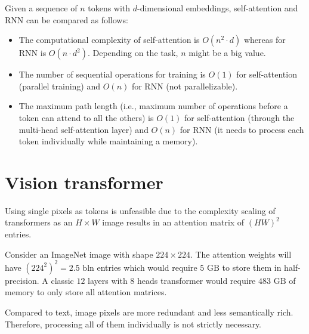 \begin{remark}
    Given a sequence of $n$ tokens with $d$-dimensional embeddings, self-attention and RNN can be compared as follows:
    \begin{itemize}
        \item The computational complexity of self-attention is $O(n^2 \cdot d)$ whereas for RNN is $O(n \cdot d^2)$. Depending on the task, $n$ might be a big value.
        \item The number of sequential operations for training is $O(1)$ for self-attention (parallel training) and $O(n)$ for RNN (not parallelizable).
        \item The maximum path length (i.e., maximum number of operations before a token can attend to all the others) is $O(1)$ for self-attention (through the multi-head self-attention layer) and $O(n)$ for RNN (it needs to process each token individually while maintaining a memory).
    \end{itemize}
\end{remark}



\section{Vision transformer}

\begin{remark}
    Using single pixels as tokens is unfeasible due to the complexity scaling of transformers as an $H \times W$ image results in an attention matrix of $(HW)^2$ entries.

    \indenttbox
    \begin{example}
        Consider an ImageNet image with shape $224 \times 224$. The attention weights will have $(224^2)^2 = 2.5 \text{ bln}$ entries which would require $5 \text{ GB}$ to store them in half-precision. A classic $12$ layers with $8$ heads transformer would require $483 \text{ GB}$ of memory to only store all attention matrices.
    \end{example}
\end{remark}

\begin{remark}
    Compared to text, image pixels are more redundant and less semantically rich. Therefore, processing all of them individually is not strictly necessary.
\end{remark}

